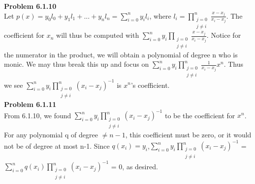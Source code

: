 \documentclass{article}
\newcommand{\Problem}[1]{\textbf{Problem #1}}
\begin{document}
\Problem{6.1.10}\\

Let $p(x) = y_0l_0 + y_1l_1 + ... + y_nl_n = \displaystyle\sum_{i = 0}^n y_il_i$, where $l_i = \displaystyle\prod_{\substack{j = 0 \\ j \neq i}}^n \frac{x - x_j}{x_i-x_j}$.
The coefficient for $x_n$ will thus be computed with $\displaystyle\sum_{i = 0}^n y_i\displaystyle\prod_{\substack{j = 0 \\ j \neq i}} \frac{x-x_j}{x_i-x_j}$.
Notice for the numerator in the product, we will obtain a polynomial of degree n who is monic. 
We may thus break this up and focus on $\displaystyle\sum_{i = 0} ^n y_i\displaystyle\prod_{\substack{j = 0 \\ j \neq i}}^n \frac{1}{x_i-x_j}x^n$.
Thus we see $\displaystyle\sum_{i = 0}^n y_i\displaystyle\prod_{\substack{j = 0 \\ j \neq i}}^n (x_i-x_j)^{-1}$ is $x^n$'s coefficient.\\

\Problem{6.1.11}\\

From 6.1.10, we found $\displaystyle\sum_{i = 0}^n y_i\displaystyle\prod_{\substack{j = 0 \\ j \neq i}}^n (x_i-x_j)^{-1}$ to be the coefficient for $x^n$.
For any polynomial q of degree $\neq n-1$, this coefficient must be zero, or it would not be of degree at most n-1. 
Since $q(x_i) = y_i$,\newline $\displaystyle\sum_{i = 0}^n y_i\displaystyle\prod_{\substack{j = 0 \\ j \neq i}}^n (x_i-x_j)^{-1}$ = $\displaystyle\sum_{i = 0}^n q(x_i)\displaystyle\prod_{\substack{j = 0 \\ j \neq i}}^n (x_i-x_j)^{-1}$ = 0, as desired.
\end{document}
